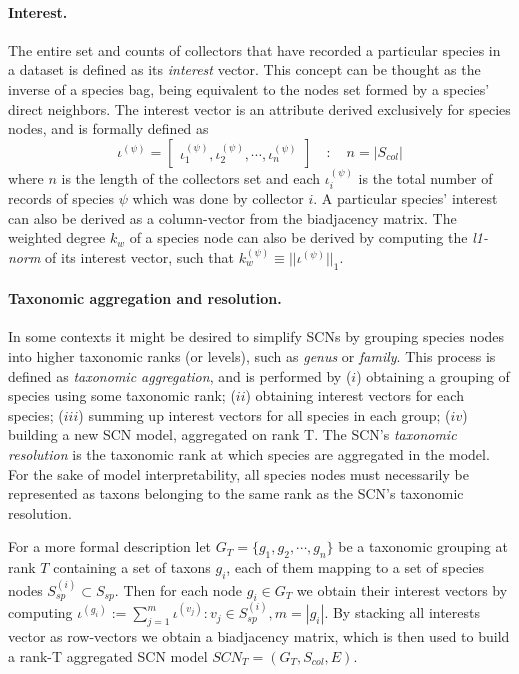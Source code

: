 \documentclass[a4paper]{article}
\begin{document}
\paragraph{Interest.} 
The entire set and counts of collectors that have recorded a particular species in a dataset is defined as its \textit{interest} vector. This concept can be thought as the inverse of a species bag, being equivalent to the nodes set formed by a species' direct neighbors. The interest vector is an attribute derived exclusively for species nodes, and is formally defined as
$$ 
\iota^{(\psi)} =  \begin{bmatrix}
\iota^{(\psi)}_1, \iota_2^{(\psi)}, \cdots, \iota_n^{(\psi)}
\end{bmatrix}  \quad : \quad 
n = |S_{col}|
$$
where $n$ is the length of the collectors set and each $\iota_i^{(\psi)}$ is the total number of records of species $\psi$ which was done by collector $i$. 
A particular species' interest can also be derived as a column-vector from the biadjacency matrix. 
The weighted degree $k_w$ of a species node can also be derived by computing the \textit{l1-norm} of its interest vector, such that $k_w^{(\psi)} \equiv || \iota^{(\psi)} ||_1 $.

\paragraph{Taxonomic aggregation and resolution.}
In some contexts it might be desired to simplify SCNs by grouping species nodes into higher taxonomic ranks (or levels), such as \textit{genus} or \textit{family}. This process is defined as \textit{taxonomic aggregation}, and is performed by 
($i$) obtaining a grouping of species using some taxonomic rank; 
($ii$) obtaining interest vectors for each species; 
($iii$) summing up interest vectors for all species in each group;
($iv$) building a new SCN model, aggregated on rank T. 
The SCN's \textit{taxonomic resolution} is the taxonomic rank at which species are aggregated in the model. For the sake of model interpretability, all species nodes must necessarily be represented as taxons belonging to the same rank as the SCN's taxonomic resolution.

For a more formal description let $G_T = \{ g_1, g_2, \cdots, g_n \}$ be a taxonomic grouping at rank $T$ containing a set of taxons $g_i$, each of them mapping to a set of species nodes $S_{sp}^{(i)} \subset S_{sp}$. Then for each node $g_i \in G_T$ we obtain their interest vectors by computing $ \iota^{(g_i)} := \sum_{j=1}^{m} \iota^{(v_j)} : v_j \in S_{sp}^{(i)}, m = |g_i|$. By stacking all interests vector as row-vectors we obtain a biadjacency matrix, which is then used to build a rank-T aggregated SCN model $SCN_T = (G_T,S_{col},E)$.
\end{document}
